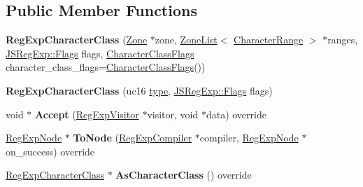 \subsection*{Public Member Functions}
\begin{DoxyCompactItemize}
\item 
\mbox{\label{classv8_1_1internal_1_1RegExpCharacterClass_a565543562a56d034654962f218646305}} 
{\bfseries Reg\+Exp\+Character\+Class} (\mbox{\hyperlink{classv8_1_1internal_1_1Zone}{Zone}} $\ast$zone, \mbox{\hyperlink{classv8_1_1internal_1_1ZoneList}{Zone\+List}}$<$ \mbox{\hyperlink{classv8_1_1internal_1_1CharacterRange}{Character\+Range}} $>$ $\ast$ranges, \mbox{\hyperlink{classv8_1_1base_1_1Flags}{J\+S\+Reg\+Exp\+::\+Flags}} flags, \mbox{\hyperlink{classv8_1_1base_1_1Flags}{Character\+Class\+Flags}} character\+\_\+class\+\_\+flags=\mbox{\hyperlink{classv8_1_1base_1_1Flags}{Character\+Class\+Flags}}())
\item 
\mbox{\label{classv8_1_1internal_1_1RegExpCharacterClass_abaa5ef0a8ae002efe5b0d5088c0d79b5}} 
{\bfseries Reg\+Exp\+Character\+Class} (uc16 \mbox{\hyperlink{classstd_1_1conditional_1_1type}{type}}, \mbox{\hyperlink{classv8_1_1base_1_1Flags}{J\+S\+Reg\+Exp\+::\+Flags}} flags)
\item 
\mbox{\label{classv8_1_1internal_1_1RegExpCharacterClass_adc213a458ec43d1a553adb2e0528ca49}} 
void $\ast$ {\bfseries Accept} (\mbox{\hyperlink{classv8_1_1internal_1_1RegExpVisitor}{Reg\+Exp\+Visitor}} $\ast$visitor, void $\ast$data) override
\item 
\mbox{\label{classv8_1_1internal_1_1RegExpCharacterClass_a01b0c45fbf9fe6f74f74d4696500600d}} 
\mbox{\hyperlink{classv8_1_1internal_1_1RegExpNode}{Reg\+Exp\+Node}} $\ast$ {\bfseries To\+Node} (\mbox{\hyperlink{classv8_1_1internal_1_1RegExpCompiler}{Reg\+Exp\+Compiler}} $\ast$compiler, \mbox{\hyperlink{classv8_1_1internal_1_1RegExpNode}{Reg\+Exp\+Node}} $\ast$on\+\_\+success) override
\item 
\mbox{\label{classv8_1_1internal_1_1RegExpCharacterClass_aaf0ba1148e04f1875b42f5493383356d}} 
\mbox{\hyperlink{classv8_1_1internal_1_1RegExpCharacterClass}{Reg\+Exp\+Character\+Class}} $\ast$ {\bfseries As\+Character\+Class} () override

\end{DoxyCompactItemize}
